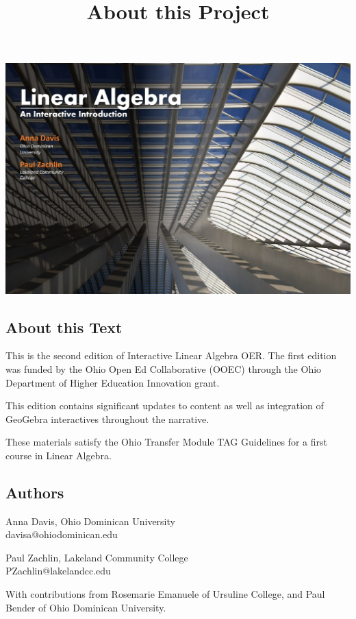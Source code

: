 \documentclass{ximera}
\title{About this Project} \license{CC-BY 4.0}
\begin{document}
\begin{abstract}
\end{abstract}
\maketitle

\begin{image}
\includegraphics{BookCover1.jpg}
\end{image}

\subsection{About this Text}
This is the second edition of Interactive Linear Algebra OER.  The first edition was funded by the Ohio Open Ed Collaborative (OOEC) through the Ohio Department of Higher Education Innovation grant. 

This edition contains significant updates to content as well as integration of GeoGebra interactives throughout the narrative.

These materials satisfy the Ohio Transfer Module TAG Guidelines for a first course in Linear Algebra.  

\subsection{Authors}
Anna Davis, Ohio Dominican University\\
davisa@ohiodominican.edu

Paul Zachlin, Lakeland Community College\\
PZachlin@lakelandcc.edu

With contributions from Rosemarie Emanuele of Ursuline College, and Paul Bender of Ohio Dominican University.
\end{document}
